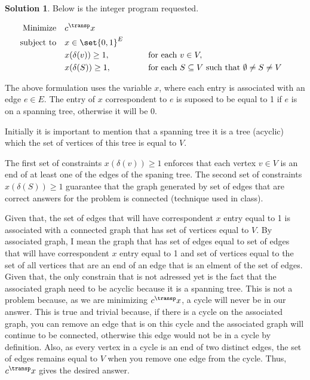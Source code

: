 \documentclass[11pt,leqno,final]{amsart}
\theoremstyle{definition}
\newtheorem{solution}{Solution}
\begin{document}

\begin{solution}
Below is the integer program requested.  

\begin{alignat*}{3}
  \text{Minimize} \quad
  & c^{\transp}x &
  \\[0pt]
  \text{subject to}\quad
  & x \in \set{0,1}^{E}&&
  \\[0pt]
  & x(\delta(v)) \geq 1, &&
  \qquad \text{for each }v \in V,
  \\[0pt]
  & x(\delta(S)) \geq 1, &&
  \qquad \text{for each } S \subseteq V \text{ such that } \emptyset \neq S \neq V
\end{alignat*}

The above formulation uses the variable $x$, where each entry is associated with an edge $e \in E$. The entry of $x$ correspondent to $e$ is suposed to be equal to 1 if $e$ is on a spanning tree, otherwise it will be 0. 

Initially it is important to mention that a spanning tree it is a tree (acyclic) which the set of vertices of this tree is equal to $V$.

The first set of constraints $x(\delta(v)) \geq 1$ enforces that each vertex $v \in V$ is an end of at least one of the edges of the spaning tree. The second set of constraints $x(\delta(S)) \geq 1$ guarantee that the graph generated by set of edges that are correct answers for the problem is connected (technique used in class). 

Given that, the set of edges that will have correspondent $x$ entry equal to 1 is associated with a connected graph that has set of vertices equal to $V$. By associated graph, I mean the graph that has set of edges equal to set of edges that will have correspondent $x$ entry equal to 1 and set of vertices equal to the set of all vertices that are an end of an edge that is an elment of the set of edges. Given that, the only constrain that is not adressed yet is the fact that the associated graph need to be acyclic because it is a spanning tree. This is not a problem because, as we are minimizing $c^{\transp}x$, a cycle will never be in our answer. This is true and trivial because, if there is a cycle on the associated graph, you can remove an edge that is on this cycle and the associated graph will continue to be connected, otherwise this edge would not be in a cycle by definition. Also, as every vertex in a cycle is an end of two distinct edges, the set of edges remains equal to $V$ when you remove one edge from the cycle. Thus, $c^{\transp}x$ gives the desired answer.
\end{solution}
\end{document}
